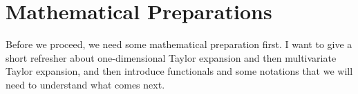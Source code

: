 \chapter{Mathematical Preparations}
Before we proceed, we need some mathematical preparation first.
I want to give a short refresher about one-dimensional Taylor expansion and then multivariate Taylor expansion, and then introduce functionals and some notations that we will need to understand what comes next.
